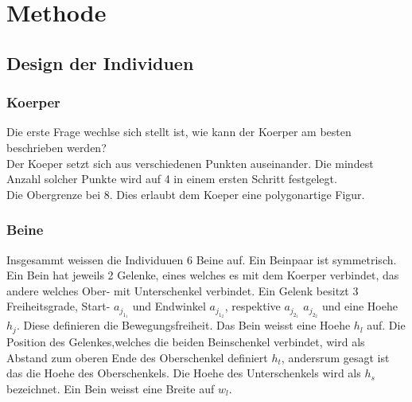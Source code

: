 %
%


\chapter{Methode}

  \section{Design der Individuen}

    \subsection{Koerper}
    \label{sub:Koerper}
      Die erste Frage wechlse sich stellt ist, wie kann der Koerper am besten beschrieben werden? \\
      Der Koeper setzt sich aus verschiedenen Punkten auseinander. Die mindest Anzahl solcher Punkte wird auf 4 in einem ersten Schritt festgelegt. \\
      Die Obergrenze bei 8. Dies erlaubt dem Koeper eine polygonartige Figur.
    \subsection {Beine}
    \label{sub:Beine}
      Insgesammt weissen die Individuuen 6 Beine auf. Ein Beinpaar ist symmetrisch. Ein Bein hat jeweils 2 Gelenke, eines welches es mit dem Koerper verbindet,
      das andere welches Ober- mit Unterschenkel verbindet. Ein Gelenk besitzt 3 Freiheitsgrade, Start- \(a_{j_{1_{1}}}\)  und Endwinkel \(a_{j_{1_{2}}}\),
      respektive \(a_{j_{2_{1}}}\) \(a_{j_{2_{2}}}\) und eine Hoehe \(h_{j}\).
      Diese definieren die Bewegungsfreiheit. Das Bein weisst eine Hoehe \(h_{l}\) auf. Die Position des Gelenkes,welches die beiden Beinschenkel verbindet,
      wird als Abstand zum oberen Ende des Oberschenkel definiert \(h_{t}\), andersrum gesagt ist das die Hoehe des Oberschenkels.
      Die Hoehe des Unterschenkels wird als \(h_{s}\) bezeichnet. Ein Bein weisst eine Breite auf \(w_{l}\). \\
      \\
